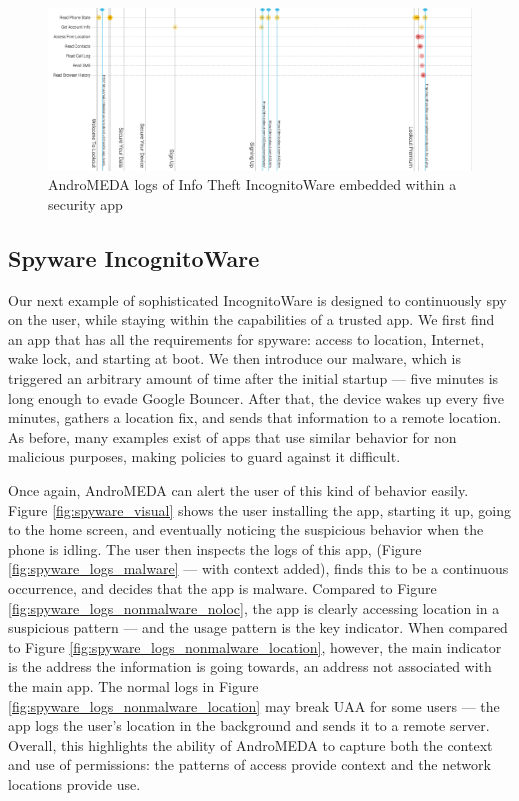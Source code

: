 \documentclass{acm_proc_article-sp}
\begin{document}
\begin{figure}[h]
\begin{center}
\includegraphics[width=1.0\columnwidth]{figs/AndroMEDA_Lookout_Malware}
\caption{AndroMEDA logs of Info Theft IncognitoWare embedded within a security app }
\label{fig:infotheft_logs_malware}
\end{center}
\end{figure}




\subsection{Spyware IncognitoWare}
Our next example of sophisticated IncognitoWare is designed to continuously spy on the user, while staying within the capabilities of a trusted app. We first find an app that has all the requirements for spyware: access to location, Internet, wake lock, and starting at boot. We then introduce our malware, which is triggered an arbitrary amount of time after the initial startup --- five minutes is long enough to evade Google Bouncer\citep{mansfield2012android}. After that, the device wakes up every five minutes, gathers a location fix, and sends that information to a remote location. As before, many examples exist of apps that use similar behavior for non malicious purposes, making policies to guard against it difficult.

Once again, AndroMEDA can alert the user of this kind of behavior easily. Figure \ref{fig:spyware_visual} shows the user installing the app, starting it up, going to the home screen, and eventually noticing the suspicious behavior when the phone is idling. The user then inspects the logs of this app, (Figure \ref{fig:spyware_logs_malware} --- with context added), finds this to be a continuous occurrence, and decides that the app is malware. Compared to Figure \ref{fig:spyware_logs_nonmalware_noloc}, the app is clearly accessing location in a suspicious pattern --- and the usage pattern is the key indicator. When compared to Figure \ref{fig:spyware_logs_nonmalware_location}, however, the main indicator is the address the information is going towards, an address not associated with the main app. The normal logs in Figure \ref{fig:spyware_logs_nonmalware_location} may break UAA for some users --- the app logs the user's location in the background and sends it to a remote server. Overall, this highlights the ability of AndroMEDA to capture both the context and use of permissions: the patterns of access provide context and the network locations provide use.
\end{document}
